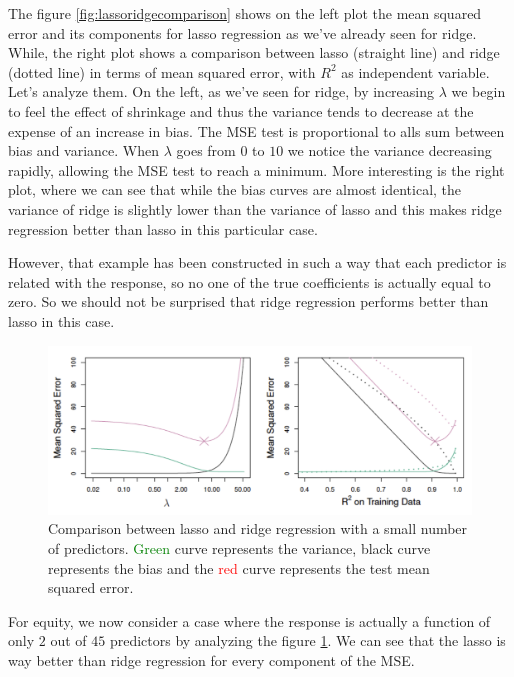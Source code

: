 The figure \ref{fig:lassoridgecomparison} shows on the left plot the mean squared error and its components for lasso regression as we've already seen for ridge. While, the right plot shows a comparison between lasso (straight line) and ridge (dotted line) in terms of mean squared error, with $R^2$ as independent variable. Let's analyze them.
On the left, as we've seen for ridge, by increasing $\lambda$ we begin to feel the effect of shrinkage and thus the variance tends to decrease at the expense of an increase in bias. The MSE test is proportional to alls sum between bias and variance. When $\lambda$ goes from $0$ to $10$ we notice the variance decreasing rapidly, allowing the MSE test to reach a minimum.
More interesting is the right plot, where we can see that while the bias curves are almost identical, the variance of ridge is slightly lower than the variance of lasso and this makes ridge regression better than lasso in this particular case.

However, that example has been constructed in such a way that each predictor is related with the response, so no one of the true coefficients is actually equal to zero. So we should not be surprised that ridge regression performs better than lasso in this case.

\begin{figure}
    \centering
    \includegraphics[width=0.8\linewidth]{./figures/chapter_4/lassoridgecomparison2.png}
    \caption{Comparison between lasso and ridge regression with a small number of predictors. \textcolor{green}{Green} curve represents the variance, black curve represents the bias and the \textcolor{red}{red} curve represents the test mean squared error.}
    \label{fig:lassoridgecomparison2}
\end{figure}

For equity, we now consider a case where the response is actually a function of only $2$ out of $45$ predictors by analyzing the figure \ref{fig:lassoridgecomparison2}. We can see that the lasso is way better than ridge regression for every component of the MSE.


